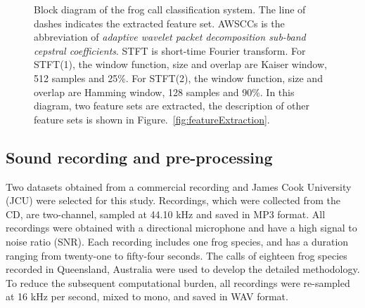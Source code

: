 \begin{figure}[htb!] %
\caption[Block diagram of the frog call classification system for wavelet-based feature extraction]{Block diagram of the frog call classification system. The line of dashes indicates the extracted feature set. AWSCCs is the abbreviation of \textit{adaptive wavelet packet decomposition sub-band cepstral coefficients}. STFT is short-time Fourier transform. For STFT(1), the window function, size and overlap are Kaiser window, 512 samples and 25\%. For STFT(2), the window function, size and overlap are Hamming window, 128 samples and 90\%. In this diagram, two feature sets are extracted, the description of other feature sets is shown in Figure.~\ref{fig:featureExtraction}.}
\label{fig:Ch5_flowchart} 
\end{figure}


\subsection{Sound recording and pre-processing}

Two datasets obtained from a commercial recording \citep{CD} and James Cook University (JCU) were selected for this study. 
Recordings, which were collected from the CD, are two-channel, sampled at 44.10 kHz and saved in MP3 format. All recordings were obtained with a directional microphone and have a high signal to noise ratio (SNR). Each recording includes one frog species, and has a duration ranging from twenty-one to fifty-four seconds. The calls of eighteen frog species recorded in Queensland, Australia were used to develop the detailed methodology. To reduce the subsequent computational burden, all recordings were re-sampled at 16 kHz per second, mixed to mono, and saved in WAV format. 

